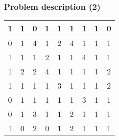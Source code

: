 \documentclass{beamer}
\begin{document}
\begin{frame}
    \frametitle{Problem description (2)}

    \begin{tabular}{|c|c|c|c|c|c|c|c|c|}
        \hline
            \cellcolor{black!10}1&\cellcolor{black!10}1&0&\cellcolor{black!10}1&\cellcolor{black!10}1&\cellcolor{black!10}1&\cellcolor{black!10}1&\cellcolor{black!10}1&0\\
        \hline
            0&\cellcolor{black!10}1&\cellcolor{blue!25}4&\cellcolor{black!10}1&\cellcolor{red!25}2&\cellcolor{blue!25}4&\cellcolor{black!10}1&\cellcolor{black!10}1&\cellcolor{black!10}1\\
        \hline  
            \cellcolor{black!10}1&\cellcolor{black!10}1&\cellcolor{black!10}1&\cellcolor{red!25}2&\cellcolor{black!10}1&\cellcolor{black!10}1&\cellcolor{blue!25}4&\cellcolor{black!10}1&\cellcolor{black!10}1\\
        \hline    
            \cellcolor{black!10}1&\cellcolor{red!25}2&\cellcolor{red!25}2&\cellcolor{blue!25}4&\cellcolor{black!10}1&\cellcolor{black!10}1&\cellcolor{black!10}1&\cellcolor{black!10}1&\cellcolor{red!25}2\\
        \hline
            \cellcolor{black!10}1&\cellcolor{black!10}1&\cellcolor{black!10}1&\cellcolor{black!10}1&\cellcolor{green!25}3&\cellcolor{black!10}1&\cellcolor{black!10}1&\cellcolor{black!10}1&\cellcolor{red!25}2\\
        \hline
            0&\cellcolor{black!10}1&\cellcolor{black!10}1&\cellcolor{black!10}1&\cellcolor{black!10}1&\cellcolor{black!10}1&\cellcolor{green!25}3&\cellcolor{black!10}1&\cellcolor{black!10}1\\
        \hline
            0&\cellcolor{black!10}1&\cellcolor{green!25}3&\cellcolor{black!10}1&\cellcolor{black!10}1&\cellcolor{red!25}2&\cellcolor{black!10}1&\cellcolor{black!10}1&\cellcolor{black!10}1\\
        \hline
            \cellcolor{black!10}1&0&\cellcolor{red!25}2&0&\cellcolor{black!10}1&\cellcolor{red!25}2&\cellcolor{black!10}1&\cellcolor{black!10}1&\cellcolor{black!10}1\\              
        \hline
    \end{tabular}
\end{frame}
\end{document}
